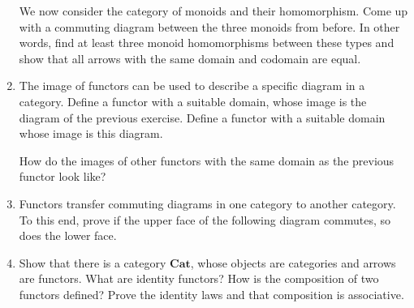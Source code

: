 \documentclass{scrartcl}
\begin{document}
\begin{enumerate}
  We now consider the category of monoids and their homomorphism.
  Come up with a commuting diagram between the three monoids from
  before.  In other words, find at least three monoid homomorphisms
  between these types and show that all arrows with the same domain
  and codomain are equal.

\item
  The image of functors can be used to describe a specific diagram in
  a category.  Define a functor with a suitable domain, whose image is
  the diagram of the previous exercise.  Define a functor with a
  suitable domain whose image is this diagram.
  \begin{center}
  \end{center}
  How do the images of other functors with the same domain as the
  previous functor look like?

\item Functors transfer commuting diagrams in one category to another
  category.  To this end, prove if the upper face of the following
  diagram commutes, so does the lower face.
  \begin{center}
  \end{center}

\item
  Show that there is a category $\mathbf{Cat}$, whose objects are
  categories and arrows are functors.  What are identity functors?
  How is the composition of two functors defined?  Prove the identity
  laws and that composition is associative.


\end{enumerate}
\end{document}
